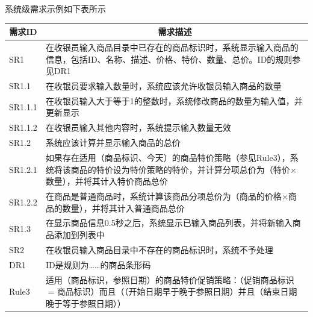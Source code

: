 系统级需求示例如下表所示
\vspace{-0.8em}
\begin{center}
    \begin{longtable}{|m{2cm}|m{11cm}|}
        \hline
        \multicolumn{1}{|c|}{需求ID}    &     \multicolumn{1}{c|}{需求描述}                                                             \\ \hline
        SR1     & 在收银员输入商品目录中已存在的商品标识时，系统显示输入商品的信息，包括ID、名称、描述、价格、特价、数量、总价。ID的规则参见DR1             \\ \hline
        \quad SR1.1   & 在收银员要求输入数量时，系统应该允许收银员输入商品的数量                                                   \\ \hline
        \quad\quad SR1.1.1 & 在收银员输入大于等于1的整数时，系统修改商品的数量为输入值，并更新显示                                            \\ \hline
        \quad\quad SR1.1.2 & 在收银员输入其他内容时，系统提示输入数量无效                                                         \\ \hline
        \quad SR1.2   & 系统应该计算并显示输入商品的总价                                                               \\ \hline
        \quad\quad SR1.2.1 & 如果存在适用（商品标识、今天）的商品特价策略（参见Rule3），系统将该商品的特价设为特价策略的特价，并计算分项总价为（特价$\times$ 数量），并将其计入特价商品总价 \\ \hline
        \quad\quad SR1.2.2 & 在商品是普通商品时，系统计算该商品分项总价为（商品的价格$\times$商品的数量），并将其计入普通商品总价                                \\ \hline
        \quad SR1.3   & 在显示商品信息0.5秒之后，系统显示已输入商品列表，并将新输入商品添加到列表中                                        \\ \hline
        SR2     & 在收银员输入商品目录中不存在的商品标识时，系统不予处理                                                    \\ \hline
        DR1     & ID是规则为……的商品条形码                                                                  \\ \hline
        Rule3   & 适用（商品标识，参照日期）的商品特价促销策略：（促销商品标识$=$商品标识）而且（（开始日期早于晚于参照日期）并且（结束日期晚于等于参照日期））         \\ \hline
    \end{longtable}
\end{center}
\vspace{-3.7em}

